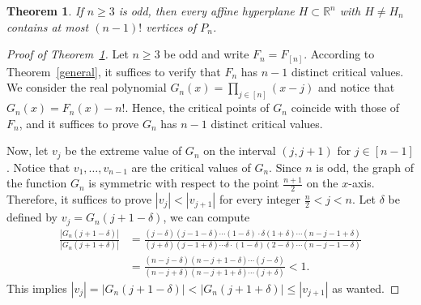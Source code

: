 \documentclass[10pt,a4paper]{amsart}
\newtheorem{theorem}{Theorem}
\begin{document}
\begin{theorem}\label{thm:main}
  If $n\ge 3$ is odd, then every affine hyperplane $H\subset\mathbb{R}^n$ with $H\neq H_n$ contains at most $(n-1)!$ vertices of $P_n$.
\end{theorem}

\begin{proof}[Proof of Theorem~\ref{thm:main}]

  Let $n \geq 3$ be odd and write $F_{n} = F_{[n]}$. According to Theorem~\ref{general}, it suffices to verify that $F_n$ has $n-1$ distinct critical values. We consider the real polynomial $G_n(x) = \prod_{j\in [n]} (x-j)$ and notice that $G_n(x) = F_n(x) - n!$. Hence, the critical points of $G_n$ coincide with those of $F_n$, and it suffices to prove $G_n$ has $n-1$ distinct critical values.

  Now, let $v_j$ be the extreme value of $G_n$ on the interval $(j,j+1)$ for $j\in [n-1]$. Notice that $v_1,\dots,v_{n-1}$ are the critical values of $G_n$. Since $n$ is odd, the graph of the function $G_n$ is symmetric with respect to the point $\frac{n+1}{2}$ on the $x$-axis. Therefore, it suffices to prove $|v_{j}| < |v_{j+1}|$ for every integer $\frac{n}{2} < j < n$. Let $\delta$ be defined by $v_j = G_n(j + 1 - \delta)$, we can compute
  \begin{align*}
    \frac{|G_n(j+1 - \delta)|}{|G_n(j+1 + \delta)|} &= \frac{(j-\delta)(j-1-\delta)\cdots(1-\delta)\cdot \delta(1+\delta)\cdots(n-j-1+\delta)}{(j+\delta)(j-1+\delta)\cdots \delta \cdot (1-\delta)(2-\delta)\cdots(n-j-1-\delta)}\\
    &=\frac{(n-j-\delta)(n-j+1-\delta)\cdots(j-\delta)}{(n-j+\delta)(n-j+1+\delta)\cdots(j+\delta)} < 1.
  \end{align*} This implies $|v_{j}| = |G_n(j+1 - \delta)| < |G_n(j+1 + \delta)| \leq |v_{j+1}|$ as wanted.
\end{proof}
\end{document}
